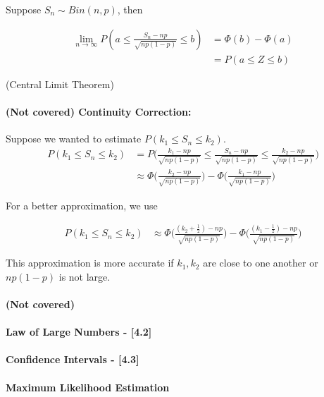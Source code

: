 \documentclass[letterpaper,12pt]{article}
\begin{document}
Suppose $S_n \sim Bin(n,p)$, then

\begin{align*}
    \lim_{n\to\infty} P(a \leq \frac{S_n - np}{\sqrt{np(1-p)}}\leq b) &= \Phi(b) - \Phi(a) \\
                                                                &= P(a\leq Z \leq b)
\end{align*}



(Central Limit Theorem)


\paragraph{(Not covered) Continuity Correction:} 
Suppose we wanted to estimate $P(k_1 \leq S_n \leq k_2)$.
\begin{align*}
    P(k_1 \leq S_n \leq k_2) &= P\bigg(\frac{k_1 - np}{\sqrt{np(1-p)}} \leq \frac{S_n - np}{\sqrt{np(1-p)}}
    \leq \frac{k_2 -np}{\sqrt{np(1-p)}}\bigg)\\
                             &\approx \Phi\bigg(\frac{k_2 -np}{\sqrt{np(1-p)}}\bigg) - 
                                \Phi\bigg(\frac{k_1 - np}{\sqrt{np(1-p)}}\bigg)
\end{align*}


For a better approximation, we use

\begin{align*}
    P(k_1 \leq S_n \leq k_2) &\approx \Phi\bigg(\frac{(k_2+\frac{1}{2}) -np}{\sqrt{np(1-p)}}\bigg) - 
                                \Phi\bigg(\frac{(k_1-\frac{1}{2}) - np}{\sqrt{np(1-p)}}\bigg)
\end{align*}


This approximation is more accurate if $k_1, k_2$ are close to one another or $np(1-p)$ is not large.


\paragraph{(Not covered)} 
\paragraph{Law of Large Numbers - [4.2]}
\paragraph{Confidence Intervals - [4.3]}
\paragraph{Maximum Likelihood Estimation}
\end{document}
